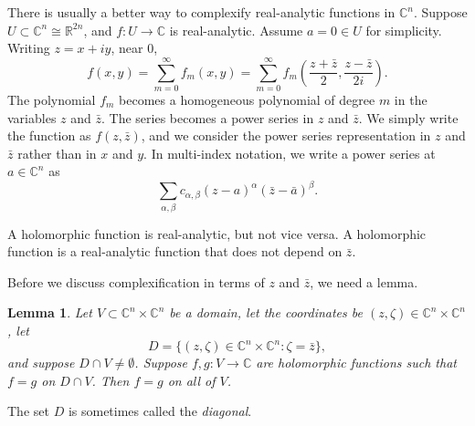 \documentclass[12pt,openany]{book}
\newcommand{\C}{{\mathbb{C}}}
\newcommand{\R}{{\mathbb{R}}}
\newcommand{\myindex}[1]{#1\index{#1}}
\theoremstyle{plain}
\newtheorem{lemma}[thm]{Lemma}
\theoremstyle{remark}
\theoremstyle{definition}
\theoremstyle{exercise}
\theoremstyle{example}
\begin{document}
There is usually a better way to complexify
real-analytic functions in $\C^n$.
Suppose $U \subset \C^n \cong \R^{2n}$, and $f \colon U \to
\C$ is real-analytic.  Assume $a=0 \in U$ for simplicity.
Writing $z = x+iy$, near $0$,
\begin{equation*}
f(x,y)
=
\sum_{m=0}^\infty
f_m(x,y)
=
\sum_{m=0}^\infty
f_m\left(
\frac{z+\bar{z}}{2},
\frac{z-\bar{z}}{2i}\right) .
\end{equation*}
The polynomial $f_m$ becomes a homogeneous polynomial of degree $m$
in the variables $z$ and $\bar{z}$.  The
series becomes a power series in $z$ and $\bar{z}$.
We simply write the function as $f(z,\bar{z})$, and we consider the
power series representation in $z$ and $\bar{z}$ rather than
in $x$ and $y$.
In multi-index notation, we write a power series at $a \in \C^n$ as
\begin{equation*}
\sum_{\alpha,\beta} c_{\alpha,\beta} {(z-a)}^\alpha
{(\bar{z}-\bar{a})}^\beta .
\end{equation*}

A holomorphic function
is real-analytic, but not vice versa.  A holomorphic function
is a real-analytic function that does not depend on $\bar{z}$.

Before we discuss complexification in terms of $z$ and $\bar{z}$, we need
a lemma.

\begin{lemma}
Let $V \subset \C^n \times \C^n$ be a domain, let the coordinates be $(z,\zeta) \in \C^n \times
\C^n$, let
\begin{equation*}
D = \bigl\{ (z,\zeta) \in \C^n \times \C^n : \zeta = \bar{z} \bigr\},
\end{equation*}
and suppose $D \cap V \not= \emptyset$.
Suppose $f,g \colon V \to \C$ are holomorphic functions such that
$f=g$ on $D \cap V$.  Then $f=g$ on all of $V$.
\end{lemma}

The set $D$ is sometimes called the \emph{\myindex{diagonal}}.
\end{document}

